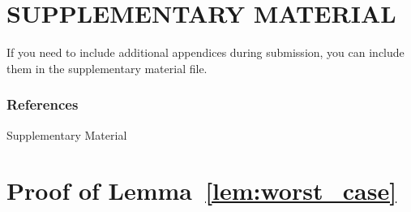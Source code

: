\documentclass[twoside]{article} \usepackage{aistats2017}
\begin{document}
\section{SUPPLEMENTARY MATERIAL}

If you need to include additional appendices during submission, you
can include them in the supplementary material file.

\fi


\newpage
\subsubsection*{References}
%


\normalsize


\clearpage
\appendix

\begin{center}
{\Large Supplementary Material}
\end{center}

\section{Proof of Lemma~\ref{lem:worst_case}}\label{app:worst_case_proof}
\end{document}
